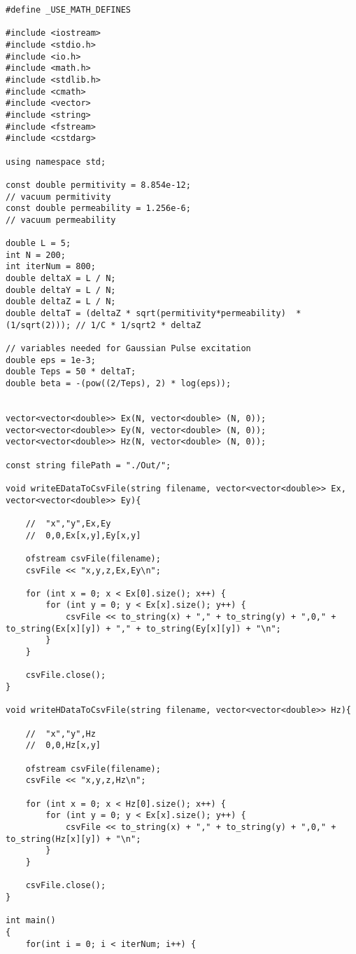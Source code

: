\begin{verbatim}
#define _USE_MATH_DEFINES

#include <iostream>
#include <stdio.h>
#include <io.h>
#include <math.h>
#include <stdlib.h>
#include <cmath>
#include <vector>
#include <string>
#include <fstream>
#include <cstdarg>

using namespace std;

const double permitivity = 8.854e-12;												// vacuum permitivity
const double permeability = 1.256e-6; 								                // vacuum permeability

double L = 5;
int N = 200;
int iterNum = 800;
double deltaX = L / N;
double deltaY = L / N;
double deltaZ = L / N;
double deltaT = (deltaZ * sqrt(permitivity*permeability)  * (1/sqrt(2))); // 1/C * 1/sqrt2 * deltaZ

// variables needed for Gaussian Pulse excitation
double eps = 1e-3;
double Teps = 50 * deltaT;
double beta = -(pow((2/Teps), 2) * log(eps));


vector<vector<double>> Ex(N, vector<double> (N, 0));
vector<vector<double>> Ey(N, vector<double> (N, 0));
vector<vector<double>> Hz(N, vector<double> (N, 0));

const string filePath = "./Out/";

void writeEDataToCsvFile(string filename, vector<vector<double>> Ex, vector<vector<double>> Ey){
	
	//	"x","y",Ex,Ey
	//	0,0,Ex[x,y],Ey[x,y]
	
	ofstream csvFile(filename);
	csvFile << "x,y,z,Ex,Ey\n";
	
	for (int x = 0; x < Ex[0].size(); x++) {
		for (int y = 0; y < Ex[x].size(); y++) {
			csvFile << to_string(x) + "," + to_string(y) + ",0," + to_string(Ex[x][y]) + "," + to_string(Ey[x][y]) + "\n";
		}
	}
	
	csvFile.close();
}

void writeHDataToCsvFile(string filename, vector<vector<double>> Hz){
	
	//	"x","y",Hz
	//	0,0,Hz[x,y]
	
	ofstream csvFile(filename);
	csvFile << "x,y,z,Hz\n";
	
	for (int x = 0; x < Hz[0].size(); x++) {
		for (int y = 0; y < Ex[x].size(); y++) {
			csvFile << to_string(x) + "," + to_string(y) + ",0," + to_string(Hz[x][y]) + "\n";
		}
	}
	
	csvFile.close();
}

int main()
{
	for(int i = 0; i < iterNum; i++) {
		

\end{verbatim}
